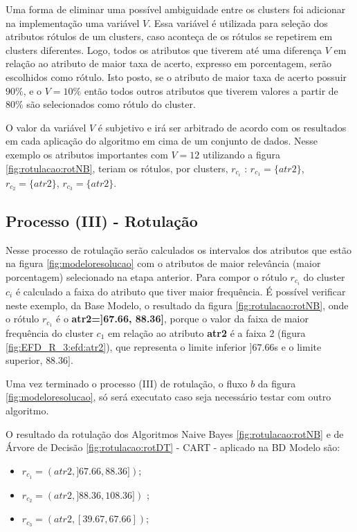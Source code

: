 Uma forma de eliminar uma possível ambiguidade entre os clusters foi adicionar na implementação uma variável  ${V}$. Essa variável é utilizada para seleção dos atributos rótulos de um clusters, caso aconteça de os rótulos se repetirem em clusters diferentes. Logo, todos os atributos que tiverem até uma diferença ${V}$ em relação ao atributo de maior taxa de acerto, expresso em porcentagem, serão escolhidos como rótulo. Isto posto, se o atributo de maior taxa de acerto possuir ${90\%}$, e o ${V=10\%}$  então todos outros atributos que tiverem valores a partir de ${80\%}$ são selecionados como rótulo do cluster.  

O valor da variável ${V}$ é subjetivo e irá ser arbitrado de acordo com os resultados em cada aplicação do algoritmo em cima de um conjunto de dados. Nesse exemplo os atributos importantes com ${V=12}$ utilizando a figura \ref{fig:rotulacao:rotNB}, teriam os rótulos, por clusters, ${r_{c_i}}$ : ${r_{c_1}=\{atr2\}}$, ${r_{c_2}=\{atr2\}}$, ${r_{c_3}=\{atr2\}}$.

\subsection{Processo (III) - Rotulação} \label{cap:ferramentas:ssec:rotulacao}

Nesse processo de rotulação serão calculados os intervalos dos atributos que estão na figura \ref{fig:modeloresolucao} com o atributos de maior relevância  (maior porcentagem) selecionado na etapa anterior. Para compor o rótulo ${r_{c_i}}$ do cluster ${c_i}$ é calculado a faixa do atributo  que tiver maior frequência. 
É possível verificar neste exemplo, da Base Modelo, o resultado da figura \ref{fig:rotulacao:rotNB}, onde o rótulo ${r_{c_1}}$ é o  \textbf{atr2=]67.66, 88.36]}, porque o valor da faixa de maior frequência do cluster ${c_1}$ em relação ao atributo \textbf{atr2} é a faixa 2 (figura \ref{fig:EFD_R_3:efd:atr2}), que representa o limite inferior ${]67.66}$s e o limite superior, ${88.36]}$.

Uma vez terminado o processo (III) de rotulação, o fluxo ${b}$ da figura \ref{fig:modeloresolucao}, só será executato caso seja necessário  testar com outro algoritmo.

O resultado da rotulação dos Algoritmos Naive Bayes  \ref{fig:rotulacao:rotNB} e de Árvore de Decisão  \ref{fig:rotulacao:rotDT} - CART - aplicado na BD Modelo são:

\begin{itemize}[noitemsep]
            \item ${r_{c_1}=(atr2,]67.66, 88.36])}$;
            \item ${r_{c_2}=(atr2,]88.36, 108.36])}$ ;
            \item ${r_{c_3}=(atr2,[39.67, 67.66])}$;
            
\end{itemize}

